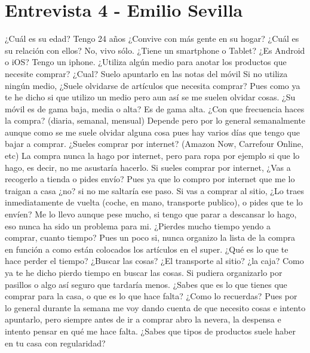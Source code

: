 \section{Entrevista 4 - Emilio Sevilla}
\begin{description}
    \preg ¿Cuál es su edad?
    \resp  Tengo 24 años
    \preg ¿Convive con más gente en su hogar? ¿Cuál es su relación con ellos?
    \resp  No, vivo sólo. 
    \preg ¿Tiene un smartphone o Tablet? ¿Es Android o iOS?
    \resp  Tengo un iphone.
    \preg ¿Utiliza algún medio para anotar los productos que necesite comprar? ¿Cual?
    \resp  Suelo apuntarlo en las notas del móvil
    \preg Si no utiliza ningún medio, ¿Suele olvidarse de artículos que necesita comprar?
    \resp  Pues como ya te he dicho si que utilizo un medio pero aun así se me suelen olvidar cosas.
    \preg ¿Su móvil es de gama baja, media o alta?
    \resp  Es de gama alta.
    \preg ¿Con que frecuencia haces la compra? (diaria, semanal, mensual)
    \resp  Depende pero por lo general semanalmente aunque como se me suele olvidar alguna cosa pues hay varios días que tengo que bajar a comprar.
    \preg ¿Sueles comprar por internet? (Amazon Now, Carrefour Online, etc)
    \resp  La compra nunca la hago por internet, pero para ropa por ejemplo si que lo hago, es decir, no me asustaría hacerlo.
    \preg Si sueles comprar por internet, ¿Vas a recogerlo a tienda o pides envío?
    \resp  Pues ya que lo compro por internet que me lo traigan a casa ¿no? si no me saltaría ese paso.
    \preg Si vas a comprar al sitio, ¿Lo traes inmediatamente de vuelta (coche, en mano, transporte publico), o pides que te lo envíen?
    \resp  Me lo llevo aunque pese mucho, si tengo que parar a descansar lo hago, eso nunca ha sido un problema para mi.
    \preg ¿Pierdes mucho tiempo yendo a comprar, cuanto tiempo?
    \resp  Pues un poco si, nunca organizo la lista de la compra en función a como están colocados los artículos en el super.
    \preg ¿Qué es lo que te hace perder el tiempo? ¿Buscar las cosas? ¿El transporte al sitio? ¿la caja?
    \resp  Como ya te he dicho pierdo tiempo en buscar las cosas. Si pudiera organizarlo por pasillos o algo así seguro que tardaría menos.
    \preg ¿Sabes que es lo que tienes que comprar para la casa, o que es lo que hace falta? ¿Como lo recuerdas?
    \resp  Pues por lo general durante la semana me voy dando cuenta de que necesito cosas e intento apuntarlo, pero siempre antes de ir a comprar abro la nevera, la despensa e intento pensar en qué me hace falta.
    \preg ¿Sabes que tipos de productos suele haber en tu casa con regularidad?

\end{description}
